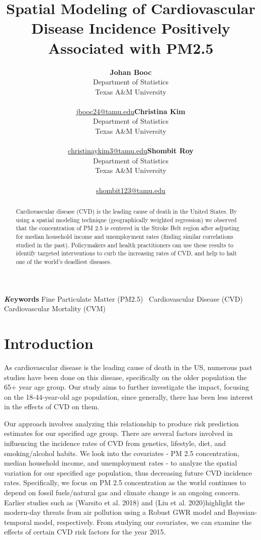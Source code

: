 \documentclass[
]{article}
\title{Spatial Modeling of Cardiovascular Disease Incidence Positively
Associated with PM2.5}
\author{\textbf{Johan Booc}\\Department of Statistics\\Texas A\&M
University\\\\\href{mailto:jbooc24@tamu.edu}{jbooc24@tamu.edu}\asep\textbf{Christina
Kim}\\Department of Statistics\\Texas A\&M
University\\\\\href{mailto:christinaykim3@tamu.edu}{christinaykim3@tamu.edu}\asep\textbf{Shombit
Roy}\\Department of Statistics\\Texas A\&M
University\\\\\href{mailto:shombit123@tamu.edu}{shombit123@tamu.edu}}
\date{}
\begin{document}
\maketitle
\begin{abstract}
Cardiovascular disease (CVD) is the leading cause of death in the United
States. By using a spatial modeling technique (geographically weighted
regression) we observed that the concentration of PM 2.5 is centered in
the Stroke Belt region after adjusting for median household income and
unemployment rates (finding similar correlations studied in the past).
Policymakers and health practitioners can use these results to identify
targeted interventions to curb the increasing rates of CVD, and help to
halt one of the world's deadliest diseases.
\end{abstract}
{\bfseries \emph Keywords}
\def\sep{\textbullet\ }
Fine Particulate Matter (PM2.5) \sep Cardiovascular Disease (CVD) \sep 
Cardiovascular Mortality (CVM)


\section{Introduction}\label{sec-intro}

As cardiovascular disease is the leading cause of death in the US,
numerous past studies have been done on this disease, specifically on
the older population the 65+ year age group. Our study aims to further
investigate the impact, focusing on the 18-44-year-old age population,
since generally, there has been less interest in the effects of CVD on
them.~

Our approach involves analyzing this relationship to produce risk
prediction estimates for our specified age group. There are several
factors involved in influencing the incidence rates of CVD from
genetics, lifestyle, diet, and smoking/alcohol habits. We look into the
covariates - PM 2.5 concentration, median household income, and
unemployment rates - to analyze the spatial variation for our specified
age population, thus decreasing future CVD incidence rates.
Specifically, we focus on PM 2.5 concentration as the world continues to
depend on fossil fuels/natural gas and climate change is an ongoing
concern. Earlier studies such as (Warsito et al. 2018) and (Liu et al.
2020)highlight the modern-day threats from air pollution using a Robust
GWR model and Bayesian-temporal model, respectively. From studying our
covariates, we can examine the effects of certain CVD risk factors for
the year 2015.~
\end{document}
